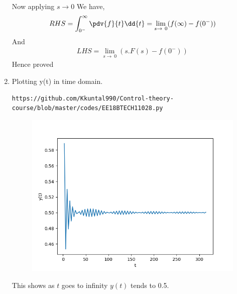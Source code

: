 \begin{enumerate}[label=\thesection.\arabic*.,ref=\thesection.\theenumi]
Now applying $ s \to 0$
We have,
\begin{align}
 RHS =\int_{0^-}^{\infty} \pdv{f}{t}\dd{t} = \lim_{s\to\ 0}(f(\infty) - f(0^{-})) 
\end{align}
And
\begin{align}
    LHS= \lim_{s\to\ 0}(s.F(s)-f(0^{-}))
\end{align}
Hence proved
\item Plotting y(t) in time domain.
\begin{lstlisting}
https://github.com/Kkuntal990/Control-theory-course/blob/master/codes/EE18BTECH11028.py
\end{lstlisting}
\begin{figure}[!h]
  \includegraphics[width=\columnwidth]{EE18BTECH11028.png}
\end{figure}

This shows as $t$ goes to infinity $y(t)$ tends to 0.5.
\end{enumerate}
